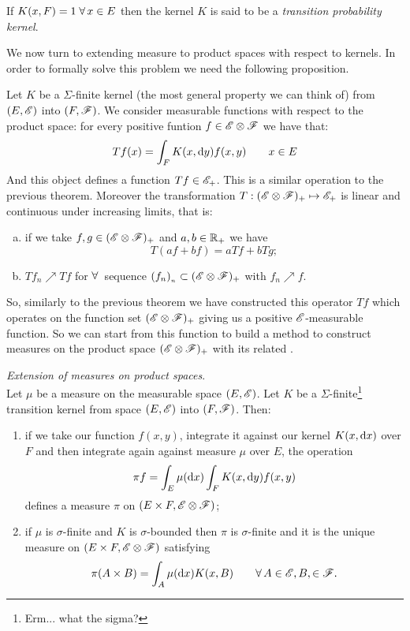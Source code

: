 \documentclass{report}
\begin{document}
\begin{definition}
	If $K(x,F)=1\;\forall\, x \in E$ then the kernel $K$ is said to be a \emph{transition probability kernel}.
\end{definition}
We now turn to extending measure to product spaces with respect to kernels. In order to formally solve this problem we need the following proposition.
\begin{proposition}
	Let $K$ be a $\Sigma$-finite kernel (the most general property we can think of) from $(E,\mathscr{E})$ into $(F,\mathscr{F})$. We consider measurable functions with respect to the product space: for every positive funtion $f\in\mathscr{E}\otimes\mathscr{F}$ we have that:
	\[Tf(x)=\int_FK(x,\mathop{}\!\mathrm{d} y)f(x,y)\qquad x\in E\]
	And this object defines a function $Tf\in\mathscr{E}_+$. This is a similar operation to the previous theorem. Moreover the transformation $T:(\mathscr{E}\otimes\mathscr{F})_+\mapsto \mathscr{E}_+$ is linear and continuous under increasing limits, that is:
	\begin{enumerate}[a)]
		\item if we take $f,g\in(\mathscr{E}\otimes\mathscr{F})_+$ and $a,b\in\mathbb{R}_+$ we have
		\[T(af+bf)=aTf+bTg;\]
		\item $Tf_n\nearrow Tf$ for $\forall\,$ sequence $(f_n)_{_{n}}\subset(\mathscr{E}\otimes\mathscr{F})_+$ with $f_n\nearrow f$.
	\end{enumerate}
\end{proposition}
So, similarly to the previous theorem we have constructed this operator $Tf$ which operates on the function set $(\mathscr{E}\otimes\mathscr{F})_+$ giving us a positive $\mathscr{E}$-measurable function. So we can start from this function to build a method to construct measures on the product space $(\mathscr{E}\otimes\mathscr{F})_+$ with its related \sa{}.
\begin{theorem}
	\emph{Extension of measures on product spaces}.\\
	Let $\mu$ be a measure on the measurable space $(E,\mathscr{E})$. Let $K$ be a $\Sigma$-finite\footnote{Erm... what the sigma?} transition kernel from space $(E,\mathscr{E})$ into $(F,\mathscr{F})$. Then:
	\begin{enumerate}[\circnum]
		\item if we take our function $f(x,y)$, integrate it against our kernel $K(x,\mathop{}\!\mathrm{d} x)$ over $F$ and then integrate again against measure $\mu$ over $E$, the operation 
		\[\pi f=\int_E\mu(\mathop{}\!\mathrm{d} x)\int_FK(x,\mathop{}\!\mathrm{d} y)f(x,y)\]
		defines a measure $\pi$ on $(E\times F,\mathscr{E}\otimes\mathscr{F})$;
		\item if $\mu$ is $\sigma$-finite and $K$ is $\sigma$-bounded then $\pi$ is $\sigma$-finite and it is the unique measure on $(E\times F,\mathscr{E}\otimes\mathscr{F})$ satisfying
		\[\pi(A\times B)=\int_A\mu(\mathop{}\!\mathrm{d} x)K(x,B)\qquad\forall\, A\in\mathscr{E},B,\in\mathscr{F}.\]
	\end{enumerate}
\end{theorem}
\end{document}
